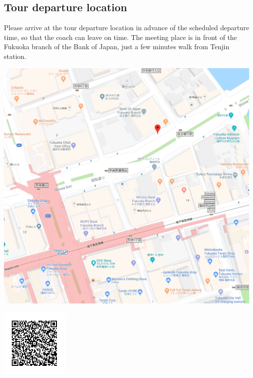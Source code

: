 \subsection*{Tour departure location}

Please arrive at the tour departure location in advance of the scheduled departure time, so that the
coach can leave on time.   
The meeting place is in front of the Fukuoka branch of the Bank of Japan, just a few minutes walk from Tenjin station.

\noindent\includegraphics[width=\textwidth]{tour_meeting_place.png}

\includegraphics[width=0.25\textwidth]{tour_meeting_place_qrcode.png}
